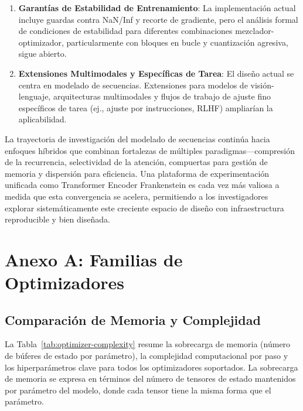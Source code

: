 \documentclass[11pt,a4paper]{article}
\begin{document}
\begin{enumerate}[leftmargin=*]
    \item \textbf{Garantías de Estabilidad de Entrenamiento}: La implementación actual incluye guardas contra NaN/Inf y recorte de gradiente, pero el análisis formal de condiciones de estabilidad para diferentes combinaciones mezclador-optimizador, particularmente con bloques en bucle y cuantización agresiva, sigue abierto.
    
    \item \textbf{Extensiones Multimodales y Específicas de Tarea}: El diseño actual se centra en modelado de secuencias. Extensiones para modelos de visión-lenguaje, arquitecturas multimodales y flujos de trabajo de ajuste fino específicos de tarea (ej., ajuste por instrucciones, RLHF) ampliarían la aplicabilidad.
\end{enumerate}

La trayectoria de investigación del modelado de secuencias continúa hacia enfoques híbridos que combinan fortalezas de múltiples paradigmas---compresión de la recurrencia, selectividad de la atención, compuertas para gestión de memoria y dispersión para eficiencia. Una plataforma de experimentación unificada como Transformer Encoder Frankenstein es cada vez más valiosa a medida que esta convergencia se acelera, permitiendo a los investigadores explorar sistemáticamente este creciente espacio de diseño con infraestructura reproducible y bien diseñada.



\appendix

\section{Anexo A: Familias de Optimizadores}
\label{sec:annex-optimizers}

\subsection{Comparación de Memoria y Complejidad}

La Tabla~\ref{tab:optimizer-complexity} resume la sobrecarga de memoria (número de búferes de estado por parámetro), la complejidad computacional por paso y los hiperparámetros clave para todos los optimizadores soportados. La sobrecarga de memoria se expresa en términos del número de tensores de estado mantenidos por parámetro del modelo, donde cada tensor tiene la misma forma que el parámetro.
\end{document}
